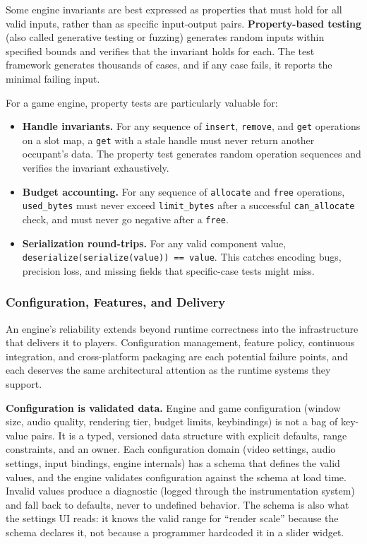 \documentclass[
  11pt,
  letterpaper,
  DIV=11,
  numbers=noendperiod,
  twoside,
  open=right]{scrreprt}
\providecommand{\tightlist}{%
  \setlength{\itemsep}{0pt}\setlength{\parskip}{0pt}}
\begin{document}
Some engine invariants are best expressed as properties that must hold
for all valid inputs, rather than as specific input-output pairs.
\textbf{Property-based testing} (also called generative testing or
fuzzing) generates random inputs within specified bounds and verifies
that the invariant holds for each. The test framework generates
thousands of cases, and if any case fails, it reports the minimal
failing input.

For a game engine, property tests are particularly valuable for:

\begin{itemize}
\tightlist
\item
  \textbf{Handle invariants.} For any sequence of \texttt{insert},
  \texttt{remove}, and \texttt{get} operations on a slot map, a
  \texttt{get} with a stale handle must never return another occupant's
  data. The property test generates random operation sequences and
  verifies the invariant exhaustively.
\item
  \textbf{Budget accounting.} For any sequence of \texttt{allocate} and
  \texttt{free} operations, \texttt{used\_bytes} must never exceed
  \texttt{limit\_bytes} after a successful \texttt{can\_allocate} check,
  and must never go negative after a \texttt{free}.
\item
  \textbf{Serialization round-trips.} For any valid component value,
  \texttt{deserialize(serialize(value))\ ==\ value}. This catches
  encoding bugs, precision loss, and missing fields that specific-case
  tests might miss.
\end{itemize}

\subsubsection{Configuration, Features, and
Delivery}\label{sec-configuration}

An engine's reliability extends beyond runtime correctness into the
infrastructure that delivers it to players. Configuration management,
feature policy, continuous integration, and cross-platform packaging are
each potential failure points, and each deserves the same architectural
attention as the runtime systems they support.

\textbf{Configuration is validated data.} Engine and game configuration
(window size, audio quality, rendering tier, budget limits, keybindings)
is not a bag of key-value pairs. It is a typed, versioned data structure
with explicit defaults, range constraints, and an owner. Each
configuration domain (video settings, audio settings, input bindings,
engine internals) has a schema that defines the valid values, and the
engine validates configuration against the schema at load time. Invalid
values produce a diagnostic (logged through the instrumentation system)
and fall back to defaults, never to undefined behavior. The schema is
also what the settings UI reads: it knows the valid range for ``render
scale'' because the schema declares it, not because a programmer
hardcoded it in a slider widget.
\end{document}
